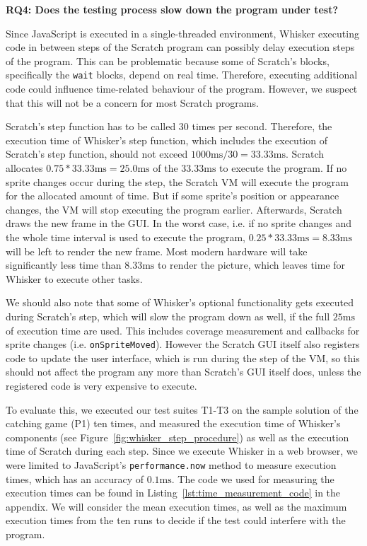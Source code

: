 \begin{center}\begin{minipage}{.9\textwidth}
    \textbf{RQ4: Does the testing process slow down the program under test?}
\end{minipage}\end{center}

\noindent Since JavaScript is executed in a single-threaded environment,
Whisker executing code in between steps of the Scratch program can possibly delay execution steps of the program.
This can be problematic because some of Scratch's blocks,
specifically the \texttt{wait} blocks, depend on real time.
Therefore, executing additional code could influence time-related behaviour of the program.
However, we suspect that this will not be a concern for most Scratch programs.
\parspace

Scratch's step function has to be called 30 times per second.
Therefore, the execution time of Whisker's step function, which includes the execution of Scratch's step function,
should not exceed $1000\text{ms}/30 = 33.33\text{ms}$.
Scratch allocates $0.75 * 33.33\text{ms} = 25.0\text{ms}$ of the $33.33\text{ms}$ to execute the program.
If no sprite changes occur during the step,
the Scratch VM will execute the program for the allocated amount of time.
But if some sprite's position or appearance changes, the VM will stop executing the program earlier.
Afterwards, Scratch draws the new frame in the GUI.
In the worst case, i.e. if no sprite changes and the whole time interval is used to execute the program,
$0.25 * 33.33\text{ms} = 8.33\text{ms}$ will be left to render the new frame.
Most modern hardware will take significantly less time than $8.33\text{ms}$ to render the picture,
which leaves time for Whisker to execute other tasks.
\parspace

We should also note that some of Whisker's optional functionality gets executed during Scratch's step,
which will slow the program down as well, if the full $25\text{ms}$ of execution time are used.
This includes coverage measurement and callbacks for sprite changes (i.e. \texttt{onSpriteMoved}).
However the Scratch GUI itself also registers code to update the user interface, which is run during the step of the VM,
so this should not affect the program any more than Scratch's GUI itself does,
unless the registered code is very expensive to execute.
\parspace

To evaluate this,
we executed our test suites T1-T3 on the sample solution of the catching game (P1) ten times,
and measured the execution time of Whisker's components (see Figure~\ref{fig:whisker_step_procedure})
as well as the execution time of Scratch during each step.
Since we execute Whisker in a web browser,
we were limited to JavaScript's \texttt{performance.now} method to measure execution times,
which has an accuracy of $0.1\text{ms}$.
The code we used for measuring the execution times can be found in Listing~\ref{lst:time_measurement_code} in the appendix.
We will consider the mean execution times, as well as the maximum execution times from the ten runs
to decide if the test could interfere with the program.

